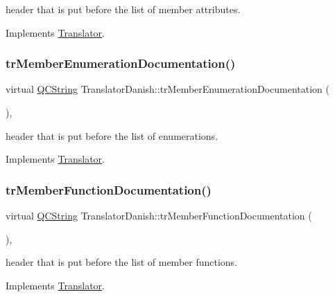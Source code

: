 header that is put before the list of member attributes. 

Implements \mbox{\hyperlink{class_translator}{Translator}}.

\mbox{\label{class_translator_danish_a09b79ec15802d96c9626666c16452733}} 
\subsubsection{\texorpdfstring{trMemberEnumerationDocumentation()}{trMemberEnumerationDocumentation()}}
{\footnotesize\ttfamily virtual \mbox{\hyperlink{class_q_c_string}{Q\+C\+String}} Translator\+Danish\+::tr\+Member\+Enumeration\+Documentation (\begin{DoxyParamCaption}{ }\end{DoxyParamCaption})\hspace{0.3cm}{\ttfamily [inline]}, {\ttfamily [virtual]}}

header that is put before the list of enumerations. 

Implements \mbox{\hyperlink{class_translator}{Translator}}.

\mbox{\label{class_translator_danish_a44b5d09bc816d376c9a6407759f5dbf2}} 
\subsubsection{\texorpdfstring{trMemberFunctionDocumentation()}{trMemberFunctionDocumentation()}}
{\footnotesize\ttfamily virtual \mbox{\hyperlink{class_q_c_string}{Q\+C\+String}} Translator\+Danish\+::tr\+Member\+Function\+Documentation (\begin{DoxyParamCaption}{ }\end{DoxyParamCaption})\hspace{0.3cm}{\ttfamily [inline]}, {\ttfamily [virtual]}}

header that is put before the list of member functions. 

Implements \mbox{\hyperlink{class_translator}{Translator}}.

